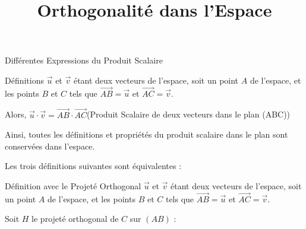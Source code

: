 \documentclass{cours}
\title{Orthogonalité dans l'Espace}
\begin{document}

    \begin{Gpartie}{Différentes Expressions du Produit Scalaire} 
        \vspace{-2ex}
        \begin{Spartie}{Définitions} 
            $\vec{u}$ et $\vec{v}$ étant deux vecteurs de l'espace, soit un point $A$ de l'espace, et les points $B$ et $C$ tels que $\overrightarrow{AB}=\vec{u}$ et $\overrightarrow{AC}=\vec{v}$.

            Alors, $\vec{u}\cdot\vec{v}=\overrightarrow{AB}\cdot\overrightarrow{AC}$\quad(Produit Scalaire de deux vecteurs dans le plan (ABC))

            Ainsi, toutes les définitions et propriétés du produit scalaire dans le plan sont conservées dans l'espace.

            Les trois définitions suivantes sont équivalentes :
            \begin{SSpartie}{Définition avec le Projeté Orthogonal} 
                $\vec{u}$ et $\vec{v}$ étant deux vecteurs de l'espace, soit un point $A$ de l'espace, et les points $B$ et $C$ tels que $\overrightarrow{AB}=\vec{u}$ et $\overrightarrow{AC}=\vec{v}$.

                Soit $H$ le projeté orthogonal de $C$ sur $(AB)$ :


\end{SSpartie}
\end{Spartie}
\end{Gpartie}
\end{document}
